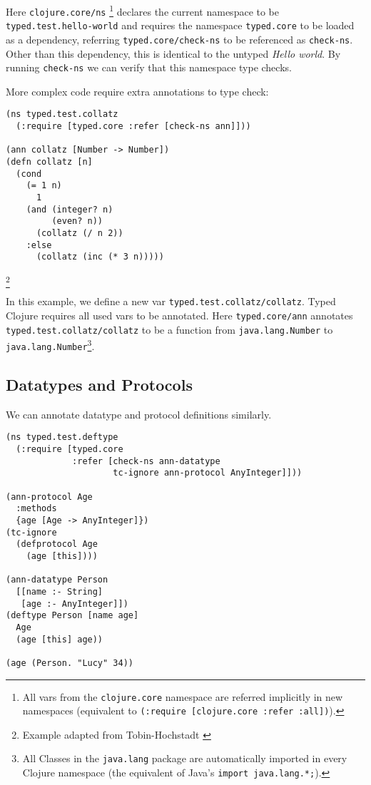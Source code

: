 Here \lstinline|clojure.core/ns|
\footnote{All vars from the \lstinline|clojure.core| namespace are referred implicitly in new namespaces (equivalent to \lstinline|(:require [clojure.core :refer :all])|).}
declares the current namespace to be 
\lstinline|typed.test.hello-world|
and requires the namespace \lstinline|typed.core| to be loaded as a dependency,
referring \lstinline|typed.core/check-ns| to be referenced as \lstinline|check-ns|. Other than this
dependency, this is identical to the untyped \emph{Hello world}.
By running \lstinline|check-ns| we can verify that this namespace type checks.

More complex code require extra annotations to type check:

\begin{lstlisting}
(ns typed.test.collatz
  (:require [typed.core :refer [check-ns ann]]))

(ann collatz [Number -> Number])
(defn collatz [n]
  (cond
    (= 1 n) 
      1
    (and (integer? n) 
         (even? n)) 
      (collatz (/ n 2))
    :else 
      (collatz (inc (* 3 n)))))
\end{lstlisting}
\footnote{Example adapted from Tobin-Hochstadt \cite{Tob10}}

In this example, we define a new var \lstinline|typed.test.collatz/collatz|. Typed Clojure requires all 
used vars to be annotated. Here \lstinline|typed.core/ann| annotates \lstinline|typed.test.collatz/collatz|
to be a function from \lstinline{java.lang.Number} to 
\lstinline{java.lang.Number}\footnote{All Classes in the \lstinline|java.lang| package
are automatically imported in every Clojure namespace (the equivalent of Java's \lstinline|import java.lang.*;|).}.

\subsection{Datatypes and Protocols}

We can annotate datatype and protocol definitions similarly.

\begin{lstlisting}
(ns typed.test.deftype
  (:require [typed.core 
             :refer [check-ns ann-datatype
                     tc-ignore ann-protocol AnyInteger]]))

(ann-protocol Age 
  :methods
  {age [Age -> AnyInteger]})
(tc-ignore
  (defprotocol Age
    (age [this])))

(ann-datatype Person 
  [[name :- String]
   [age :- AnyInteger]])
(deftype Person [name age]
  Age
  (age [this] age))

(age (Person. "Lucy" 34))
\end{lstlisting}

